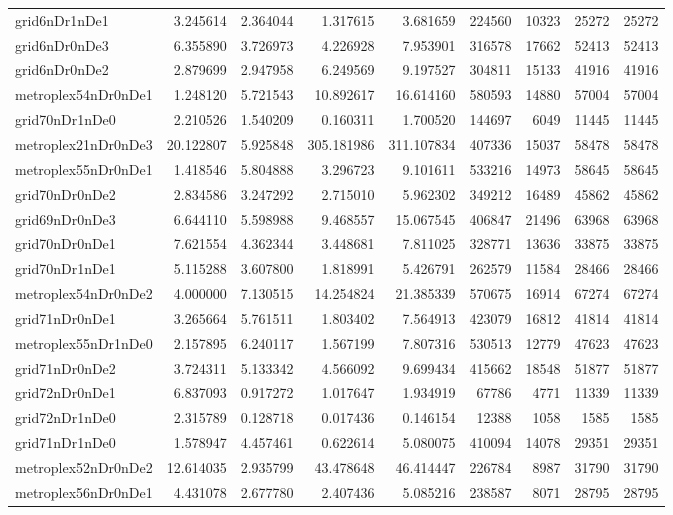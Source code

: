 \begin{longtable}{|l|r|r|r|r|r|r|r|r|}
grid6nDr1nDe1 & 3.245614 & 2.364044 & 1.317615 & 3.681659 & 224560 & 10323 & 25272 & 25272 \\
grid6nDr0nDe3 & 6.355890 & 3.726973 & 4.226928 & 7.953901 & 316578 & 17662 & 52413 & 52413 \\
grid6nDr0nDe2 & 2.879699 & 2.947958 & 6.249569 & 9.197527 & 304811 & 15133 & 41916 & 41916 \\
metroplex54nDr0nDe1 & 1.248120 & 5.721543 & 10.892617 & 16.614160 & 580593 & 14880 & 57004 & 57004 \\
grid70nDr1nDe0 & 2.210526 & 1.540209 & 0.160311 & 1.700520 & 144697 & 6049 & 11445 & 11445 \\
metroplex21nDr0nDe3 & 20.122807 & 5.925848 & 305.181986 & 311.107834 & 407336 & 15037 & 58478 & 58478 \\
metroplex55nDr0nDe1 & 1.418546 & 5.804888 & 3.296723 & 9.101611 & 533216 & 14973 & 58645 & 58645 \\
grid70nDr0nDe2 & 2.834586 & 3.247292 & 2.715010 & 5.962302 & 349212 & 16489 & 45862 & 45862 \\
grid69nDr0nDe3 & 6.644110 & 5.598988 & 9.468557 & 15.067545 & 406847 & 21496 & 63968 & 63968 \\
grid70nDr0nDe1 & 7.621554 & 4.362344 & 3.448681 & 7.811025 & 328771 & 13636 & 33875 & 33875 \\
grid70nDr1nDe1 & 5.115288 & 3.607800 & 1.818991 & 5.426791 & 262579 & 11584 & 28466 & 28466 \\
metroplex54nDr0nDe2 & 4.000000 & 7.130515 & 14.254824 & 21.385339 & 570675 & 16914 & 67274 & 67274 \\
grid71nDr0nDe1 & 3.265664 & 5.761511 & 1.803402 & 7.564913 & 423079 & 16812 & 41814 & 41814 \\
metroplex55nDr1nDe0 & 2.157895 & 6.240117 & 1.567199 & 7.807316 & 530513 & 12779 & 47623 & 47623 \\
grid71nDr0nDe2 & 3.724311 & 5.133342 & 4.566092 & 9.699434 & 415662 & 18548 & 51877 & 51877 \\
grid72nDr0nDe1 & 6.837093 & 0.917272 & 1.017647 & 1.934919 & 67786 & 4771 & 11339 & 11339 \\
grid72nDr1nDe0 & 2.315789 & 0.128718 & 0.017436 & 0.146154 & 12388 & 1058 & 1585 & 1585 \\
grid71nDr1nDe0 & 1.578947 & 4.457461 & 0.622614 & 5.080075 & 410094 & 14078 & 29351 & 29351 \\
metroplex52nDr0nDe2 & 12.614035 & 2.935799 & 43.478648 & 46.414447 & 226784 & 8987 & 31790 & 31790 \\
metroplex56nDr0nDe1 & 4.431078 & 2.677780 & 2.407436 & 5.085216 & 238587 & 8071 & 28795 & 28795 \\

\end{longtable}
